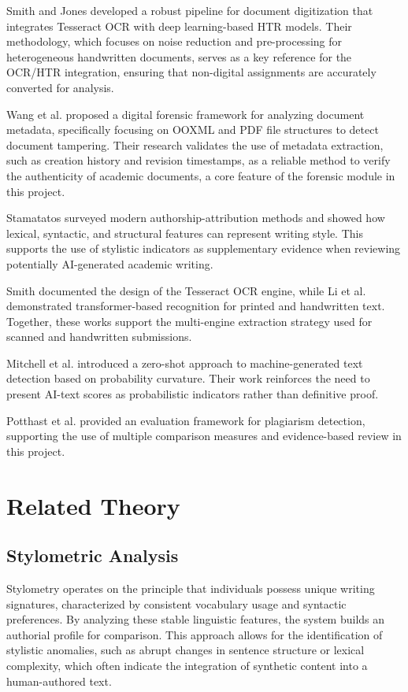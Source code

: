 \documentclass[12pt, a4paper]{report}
\numberwithin{equation}{chapter}
\begin{document}
Smith and Jones \cite{smith} developed a robust pipeline for document digitization that integrates Tesseract OCR with deep learning-based HTR models. Their methodology, which focuses on noise reduction and pre-processing for heterogeneous handwritten documents, serves as a key reference for the OCR/HTR integration, ensuring that non-digital assignments are accurately converted for analysis.

Wang et al. \cite{wang} proposed a digital forensic framework for analyzing document metadata, specifically focusing on OOXML and PDF file structures to detect document tampering. Their research validates the use of metadata extraction, such as creation history and revision timestamps, as a reliable method to verify the authenticity of academic documents, a core feature of the forensic module in this project.


Stamatatos \cite{stamatatos} surveyed modern authorship-attribution methods and showed how lexical, syntactic, and structural features can represent writing style. This supports the use of stylistic indicators as supplementary evidence when reviewing potentially AI-generated academic writing.

Smith \cite{raysmith} documented the design of the Tesseract OCR engine, while Li et al. \cite{li} demonstrated transformer-based recognition for printed and handwritten text. Together, these works support the multi-engine extraction strategy used for scanned and handwritten submissions.

Mitchell et al. \cite{mitchell} introduced a zero-shot approach to machine-generated text detection based on probability curvature. Their work reinforces the need to present AI-text scores as probabilistic indicators rather than definitive proof.

Potthast et al. \cite{potthast} provided an evaluation framework for plagiarism detection, supporting the use of multiple comparison measures and evidence-based review in this project.

                                                                      \section{Related Theory}
\subsection{Stylometric Analysis}

Stylometry operates on the principle that individuals possess unique writing signatures, characterized by consistent vocabulary usage and syntactic preferences.
By analyzing these stable linguistic features, the system builds an authorial profile for comparison. This approach allows for the identification of stylistic anomalies, such as abrupt changes in sentence structure or lexical complexity, which often indicate the integration of synthetic content into a human-authored text.
\end{document}
